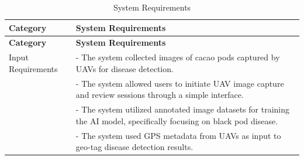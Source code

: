 \begin{longtable}{p{4cm} p{8cm}}
	\caption{System Requirements} \label{tab:sysreq}                                                                                                                                                                                                                                 \\
	
	\toprule
	\textbf{Category}        & \textbf{System Requirements}                                                                                                                                                                                                                         \\
	\midrule
	\endfirsthead
	
	\toprule
	\textbf{Category}        & \textbf{System Requirements}                                                                                                                                                                                                                         \\
	\midrule
	\endhead
	
	\bottomrule
	\endfoot
	
	Input Requirements       & - The system collected images of cacao pods captured by UAVs for disease detection.                                                                                                                                  \\
	& - The system allowed users to initiate UAV image capture and review sessions through a simple interface.                                                                                                              \\
	& - The system utilized annotated image datasets for training the AI model, specifically focusing on black pod disease.                                                                                                \\
	& - The system used GPS metadata from UAVs as input to geo-tag disease detection results.                                                                                                                              \\
	\midrule
	

\end{longtable}
